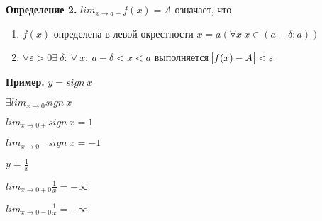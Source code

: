 \documentclass{article}
\begin{document}
  \textbf{Определение 2.} \( lim_{x \rightarrow a-} f(x) = A \) означает, что
  \begin{enumerate}
    \item \(f(x)\) определена в левой окрестности \(x=a(\forall x\ x \in (a-\delta; a))\)
    \item \( \forall \varepsilon > 0 \exists\ \delta:\ \forall\ x:\ a - \delta < x < a \) выполняется \( \abs{f(x) - A} < \varepsilon \)
     \end{enumerate}

  \textbf{Пример.} \(y = sign\ x\)

  
  \( \exists lim_{x \rightarrow 0} sign\ x \)

  \( lim_{x \rightarrow 0+} sign\ x = 1 \)

  \( lim_{x \rightarrow 0-} sign\ x = -1\)

  \( y = \frac{1}{x} \)

  \(lim_{x \rightarrow 0+0} \frac{1}{x} = +\infty\)

  \(lim_{x \rightarrow 0-0} \frac{1}{x} = -\infty\)
 
\end{document}

